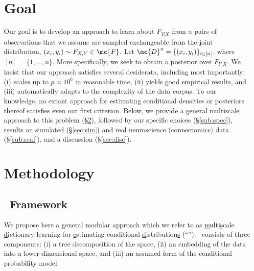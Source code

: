 \section{Goal} \label{sec:goal}

Our goal is to develop an approach to learn about $F_{Y|X}$ from $n$ pairs of observations that we assume are sampled exchangeable from the joint distribution, $(x_i,y_i) \sim F_{X,Y} \in \mc{F}$. Let $\mc{D}^n=\{(x_i,y_i)\}_{i \in [n]}$, where $[n]=\{1,\ldots, n\}$.  More specifically, we seek to obtain a posterior over $F_{Y|X}$.  We insist that our approach satisfies several desiderata, including most importantly: (i) scales up to $p \approx 10^6$ in reasonable time,  (ii) yields good empirical results, and (iii) automatically adapts to the complexity of the data corpus.  To our knowledge, no extant approach for estimating conditional densities or posteriors thereof satisfies even our first criterion. Below, we provide a general multiscale approach to this problem (\S \ref{sec:method}), followed by our specific choices (\S \ref{sub:spec}), results on simulated (\S \ref{sec:sim}) and real neuroscience (connectomics) data (\S \ref{sub:real}), and a discussion (\S \ref{sec:disc}).

% 
% 
% 



\section{Methodology} \label{sec:method}

\subsection{\msd~Framework}

We propose here a general modular approach which we refer to as \uline{m}ulti\uline{s}cale \uline{d}ictionary learning for \uline{e}stimating conditional \uline{d}istribution\uline{s} (``\msd''). \msd~consists of three components: (i) a tree decomposition of the space, (ii) an embedding of the data into a lower-dimensional space, %
 and (iii) an assumed form of the conditional probability model. %


